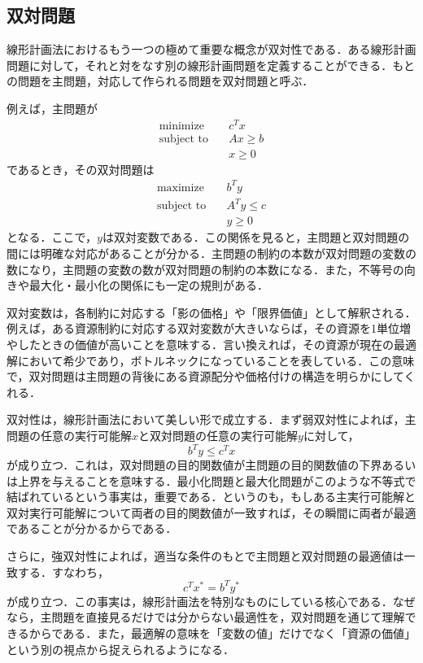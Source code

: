 \subsection{双対問題}

線形計画法におけるもう一つの極めて重要な概念が双対性である．ある線形計画問題に対して，それと対をなす別の線形計画問題を定義することができる．もとの問題を主問題，対応して作られる問題を双対問題と呼ぶ\cite{Kanno2012}．

例えば，主問題が
\begin{align}
\text{minimize}\quad&c^Tx\\
\text{subject to}\quad&Ax\ge b\\
&x\ge 0
\end{align}
であるとき，その双対問題は
\begin{align}
\text{maximize}\quad&b^Ty\\
\text{subject to}\quad&A^Ty\le c\\
&y\ge 0
\end{align}
となる．ここで，$y$は双対変数である．この関係を見ると，主問題と双対問題の間には明確な対応があることが分かる．主問題の制約の本数が双対問題の変数の数になり，主問題の変数の数が双対問題の制約の本数になる．また，不等号の向きや最大化・最小化の関係にも一定の規則がある．

双対変数は，各制約に対応する「影の価格」や「限界価値」として解釈される．例えば，ある資源制約に対応する双対変数が大きいならば，その資源を1単位増やしたときの価値が高いことを意味する．言い換えれば，その資源が現在の最適解において希少であり，ボトルネックになっていることを表している．この意味で，双対問題は主問題の背後にある資源配分や価格付けの構造を明らかにしてくれる．

双対性は，線形計画法において美しい形で成立する．まず弱双対性によれば，主問題の任意の実行可能解$x$と双対問題の任意の実行可能解$y$に対して，
\begin{equation}
b^Ty\le c^Tx
\end{equation}
が成り立つ．これは，双対問題の目的関数値が主問題の目的関数値の下界あるいは上界を与えることを意味する．最小化問題と最大化問題がこのような不等式で結ばれているという事実は，重要である．というのも，もしある主実行可能解と双対実行可能解について両者の目的関数値が一致すれば，その瞬間に両者が最適であることが分かるからである．

さらに，強双対性によれば，適当な条件のもとで主問題と双対問題の最適値は一致する．すなわち，
\begin{equation}
c^Tx^*=b^Ty^*
\end{equation}
が成り立つ．この事実は，線形計画法を特別なものにしている核心である．なぜなら，主問題を直接見るだけでは分からない最適性を，双対問題を通じて理解できるからである．また，最適解の意味を「変数の値」だけでなく「資源の価値」という別の視点から捉えられるようになる．

